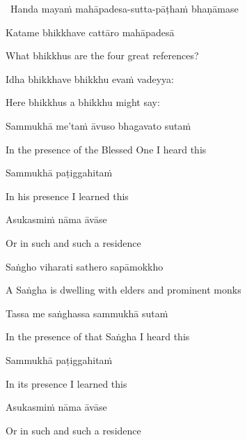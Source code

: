 \begin{leader}
  \anglebracketleft\ \hspace{-0.5mm}Handa mayaṁ mahāpadesa-sutta-pāṭhaṁ bhaṇāmase \hspace{-0.5mm}\anglebracketright\
\end{leader}

Katame bhikkhave cattāro mahāpadesā

\begin{english}
  What bhikkhus are the four great references?
\end{english}

Idha bhikkhave bhikkhu evaṁ vadeyya:

\begin{english}
  Here bhikkhus a bhikkhu might say:
\end{english}

Sammukhā me'taṁ āvuso bhagavato sutaṁ

\begin{english}
  In the presence of the Blessed One I heard this
\end{english}

Sammukhā paṭiggahitaṁ

\begin{english}
  In his presence I learned this
\end{english}

Asukasmiṁ nāma āvāse

\begin{english}
  Or in such and such a residence
\end{english}

Saṅgho viharati sathero sapāmokkho

\begin{english}
  A Saṅgha is dwelling with elders and prominent monks
\end{english}

Tassa me saṅghassa sammukhā sutaṁ

\begin{english}
  In the presence of that Saṅgha I heard this
\end{english}

\ifninebythirteen\clearpage\fi

Sammukhā paṭiggahitaṁ

\begin{english}
  In its presence I learned this
\end{english}

Asukasmiṁ nāma āvāse

\begin{english}
  Or in such and such a residence
\end{english}

